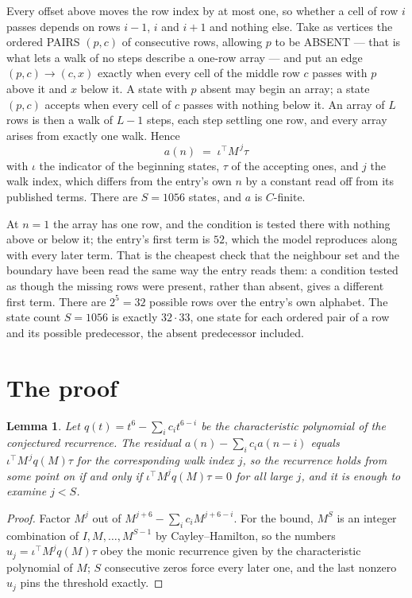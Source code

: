 \documentclass[11pt,a4paper]{article}
\theoremstyle{plain}
\newtheorem{lemma}[theorem]{Lemma}
\theoremstyle{definition}
\begin{document}
Every offset above moves the row index by at most one, so whether a cell of row $i$ passes
depends on rows $i-1$, $i$ and $i+1$ and nothing else. Take as vertices the ordered PAIRS
$(p,c)$ of consecutive rows, allowing $p$ to be ABSENT --- that is what lets a walk of no steps
describe a one-row array --- and put an edge $(p,c)\to(c,x)$ exactly when every cell of the
middle row $c$ passes with $p$ above it and $x$ below it. A state with $p$ absent may begin an
array; a state $(p,c)$ accepts when every cell of $c$ passes with nothing below it. An array of
$L$ rows is then a walk of $L-1$ steps, each step settling one row, and every array arises from
exactly one walk. Hence
\[
a(n)\;=\;\iota^{\!\top}M^{\,j}\tau
\]
with $\iota$ the indicator of the beginning states, $\tau$ of the accepting ones, and $j$ the
walk index, which differs from the entry's own $n$ by a constant read off from its published
terms. There are $S=1056$ states, and $a$ is $C$-finite.

At $n=1$ the array has one row, and
the condition is tested there with nothing above or below it; the entry's first term is
$52$, which the model reproduces along with every later term. That is the cheapest check
that the neighbour set and the boundary have been read the same way the entry reads them: a
condition tested as though the missing rows were present, rather than absent, gives a different
first term. There are $2^{5}=32$ possible rows over the entry's own alphabet. The state count $S=1056$ is exactly $32\cdot33$,
one state for each ordered pair of a row and its possible predecessor, the absent predecessor
included.

\section{The proof}

\begin{lemma}\label{lem:crit}
Let $q(t)=t^{6}-\sum_i c_it^{6-i}$ be the characteristic polynomial of the
conjectured recurrence. The residual $a(n)-\sum_ic_ia(n-i)$ equals
$\iota^{\!\top}M^{\,j}q(M)\tau$ for the corresponding walk index $j$, so the recurrence
holds from some point on if and only if $\iota^{\!\top}M^{j}q(M)\tau=0$ for all large $j$,
and it is enough to examine $j<S$.
\end{lemma}

\begin{proof}
Factor $M^{j}$ out of $M^{j+6}-\sum_ic_iM^{j+6-i}$. For the bound, $M^{S}$
is an integer combination of $I,M,\dots,M^{S-1}$ by Cayley--Hamilton, so the numbers
$u_j=\iota^{\!\top}M^{j}q(M)\tau$ obey the monic recurrence given by the characteristic
polynomial of $M$; $S$ consecutive zeros force every later one, and the last nonzero $u_j$
pins the threshold exactly.
\end{proof}
\end{document}
